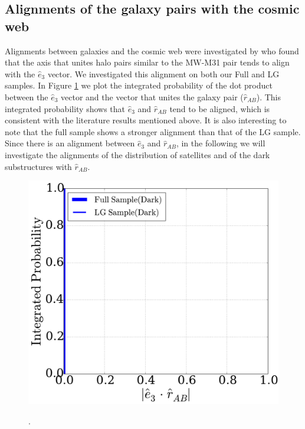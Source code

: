 \subsection{Alignments of the galaxy pairs with the cosmic web}
\label{AlignmentsGalCosmicWeb}
Alignments between galaxies and the cosmic web were investigated by \citep{ForeroRomero2013} who found that the axis that unites halo pairs similar to the MW-M31 pair tends to align with the $\hat e_3$ vector. 
We investigated this alignment on both our Full and LG samples. 
In Figure \ref{fig:alignment_e3_cosmicweb} we plot the integrated probability of the dot product between the $\hat e_3$ vector and the vector that unites the galaxy pair ($\hat r_{AB}$). 
This integrated probability shows that $\hat e_3$ and $\hat r_{AB}$ tend to be aligned, which is consistent with the literature results mentioned above. 
It is also interesting to note that the full sample shows a stronger alignment than that of the LG sample. Since there is an alignment between $\hat e_3$ and $\hat r_{AB}$, in the following we will investigate the alignments of the distribution of satellites and of the dark substructures with $\hat r_{AB}$.\\
\begin{figure}
\includegraphics[width=\hsize]{r_tweb_e3_alignment.pdf}\\
\caption{.}
\label{fig:alignment_e3_cosmicweb}
\end{figure}

